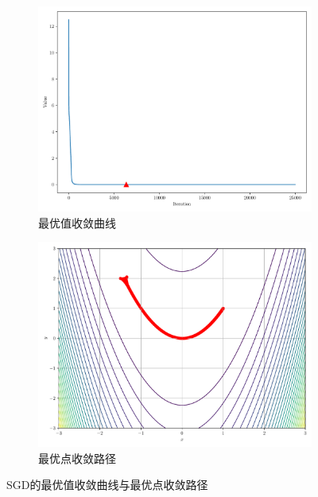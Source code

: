 \begin{figure}[!ht]
    \centering
    \begin{subfigure}{0.4\textwidth}
        \centering
        \includegraphics[width=\textwidth]{figures/SGD_loss.pdf}
        \caption{最优值收敛曲线}
    \end{subfigure}
    \begin{subfigure}{0.4\textwidth}
        \centering
        \includegraphics[width=\textwidth]{figures/SGD_points.pdf}
        \caption{最优点收敛路径}
    \end{subfigure}
    \caption{SGD的最优值收敛曲线与最优点收敛路径}
\end{figure}
